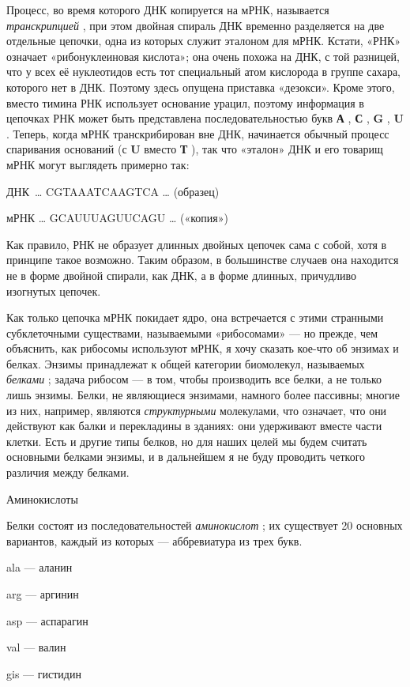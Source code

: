 \documentclass[../main.tex]{subfiles}
\begin{document}
Процесс, во время которого ДНК копируется на мРНК, называется \emph{транскрипцией} , при этом двойная спираль ДНК временно разделяется на две отдельные цепочки, одна из которых служит эталоном для мРНК\@. Кстати, «РНК» означает «рибонуклеиновая кислота»; она очень похожа на ДНК, с той разницей, что у всех её нуклеотидов есть тот специальный атом кислорода в группе сахара, которого нет в ДНК\@. Поэтому здесь опущена приставка «дезокси». Кроме этого, вместо тимина РНК использует основание урацил, поэтому информация в цепочках РНК может быть представлена последовательностью букв \textbf{А} , \textbf{С} , \textbf{G} , \textbf{U} . Теперь, когда мРНК транскрибирован вне ДНК, начинается обычный процесс спаривания оснований (с \textbf{U} вместо \textbf{Т} ), так что «эталон» ДНК и его товарищ мРНК могут выглядеть примерно так:

ДНК~\ldots{} CGTAAATCAAGTCA \ldots{} (образец)

мРНК \ldots{} GCAUUUAGUUCAGU \ldots{} («копия»)

Как правило, РНК не образует длинных двойных цепочек сама с собой, хотя в принципе такое возможно. Таким образом, в большинстве случаев она находится не в форме двойной спирали, как ДНК, а в форме длинных, причудливо изогнутых цепочек.

Как только цепочка мРНК покидает ядро, она встречается с этими странными субклеточными существами, называемыми «рибосомами» --- но прежде, чем объяснить, как рибосомы используют мРНК, я хочу сказать кое-что об энзимах и белках. Энзимы принадлежат к общей категории биомолекул, называемых \emph{белками} ; задача рибосом --- в том, чтобы производить все белки, а не только лишь энзимы. Белки, не являющиеся энзимами, намного более пассивны; многие из них, например, являются \emph{структурными} молекулами, что означает, что они действуют как балки и перекладины в зданиях: они удерживают вместе части клетки. Есть и другие типы белков, но для наших целей мы будем считать основными белками энзимы, и в дальнейшем я не буду проводить четкого различия между белками.

Аминокислоты

Белки состоят из последовательностей \emph{аминокислот} ; их существует 20 основных вариантов, каждый из которых --- аббревиатура из трех букв.

ala --- аланин

arg --- аргинин

asp --- аспарагин

val --- валин

gis --- гистидин
\end{document}

